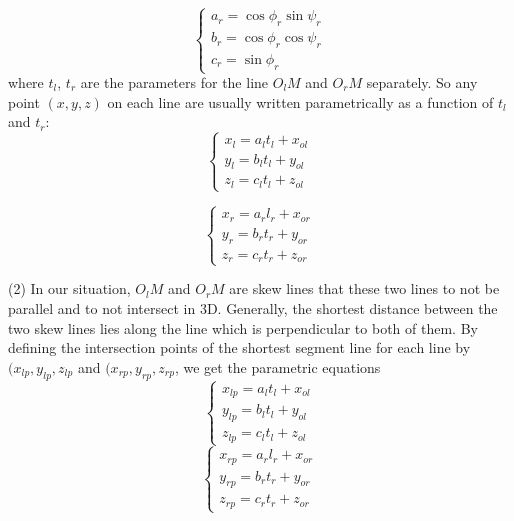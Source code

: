 \begin{equation} 
\left\{ 
\begin{array}{lll} 
a_r = \cos \phi_r \sin \psi_r\\
b_r = \cos \phi_r \cos \psi_r\\
c_r = \sin \phi_r
\end{array} 
\right.
\end{equation}
where $t_l$, $t_r$ are the parameters for the line $O_lM$ and $O_rM$ separately.
So any point $(x, y, z)$ on each line are usually written parametrically as a function of $t_l$ and $t_r$:
\begin{equation}  
	\left\{ 
	\begin{array}{lll} 
		x_l = a_l t_l + x_{ol} \\
		y_l = b_l t_l + y_{ol} \\
		z_l = c_l t_l + z_{ol}
	\end{array} 
	\right.
\end{equation}

\begin{equation}  
	\left\{ 
	\begin{array}{lll} 
		x_r = a_r l_r + x_{or} \\
		y_r = b_r t_r + y_{or} \\
		z_r = c_r t_r + z_{or}
	\end{array} 
	\right.
\end{equation}

(2) In our situation, $O_lM$ and $O_rM$ are skew lines that these two lines to not be parallel and to not intersect in 3D. Generally, the shortest distance between the two skew lines lies along the line which is perpendicular to both of them. By defining the intersection points of the shortest segment line for each line by $(x_{lp}, y_{lp}, z_{lp}$ and $(x_{rp}, y_{rp}, z_{rp}$, we get the parametric equations
\begin{equation}  
	\left\{ 
	\begin{array}{lll} 
		x_{lp} = a_l t_l + x_{ol} \\
		y_{lp} = b_l t_l + y_{ol} \\
		z_{lp} = c_l t_l + z_{ol}
	\end{array} 
	\right.
\end{equation}
\begin{equation}  
	\left\{ 
	\begin{array}{lll} 
		x_{rp} = a_r l_r + x_{or} \\
		y_{rp} = b_r t_r + y_{or} \\
		z_{rp} = c_r t_r + z_{or}
	\end{array} 
	\right.
\end{equation}


